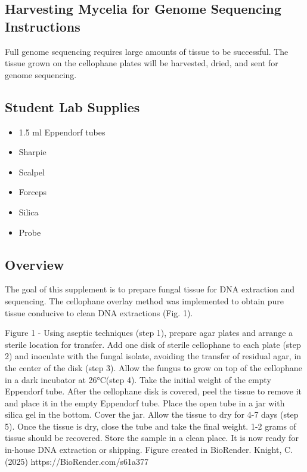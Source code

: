 \documentclass[
  letterpaper,
  DIV=11,
  numbers=noendperiod]{scrreprt}
\providecommand{\tightlist}{%
  \setlength{\itemsep}{0pt}\setlength{\parskip}{0pt}}
\begin{document}
\subsection*{Harvesting Mycelia for Genome Sequencing
Instructions}\label{harvesting-mycelia-for-genome-sequencing-instructions}

Full genome sequencing requires large amounts of tissue to be
successful. The tissue grown on the cellophane plates will be harvested,
dried, and sent for genome sequencing.

\subsection*{Student Lab Supplies}\label{student-lab-supplies-1}

\begin{itemize}
\tightlist
\item
  1.5 ml Eppendorf tubes
\item
  Sharpie
\item
  Scalpel
\item
  Forceps
\item
  Silica
\item
  Probe
\end{itemize}

\subsection*{Overview}\label{overview-1}

The goal of this supplement is to prepare fungal tissue for DNA
extraction and sequencing. The cellophane overlay method was implemented
to obtain pure tissue conducive to clean DNA extractions (Fig. 1).

Figure 1 - Using aseptic techniques (step 1), prepare agar plates and
arrange a sterile location for transfer. Add one disk of sterile
cellophane to each plate (step 2) and inoculate with the fungal isolate,
avoiding the transfer of residual agar, in the center of the disk (step
3). Allow the fungus to grow on top of the cellophane in a dark
incubator at 26°C(step 4). Take the initial weight of the empty
Eppendorf tube. After the cellophane disk is covered, peel the tissue to
remove it and place it in the empty Eppendorf tube. Place the open tube
in a jar with silica gel in the bottom. Cover the jar. Allow the tissue
to dry for 4-7 days (step 5). Once the tissue is dry, close the tube and
take the final weight. 1-2 grams of tissue should be recovered. Store
the sample in a clean place. It is now ready for in-house DNA extraction
or shipping. Figure created in BioRender. Knight, C. (2025)
https://BioRender.com/s61a377
\end{document}

